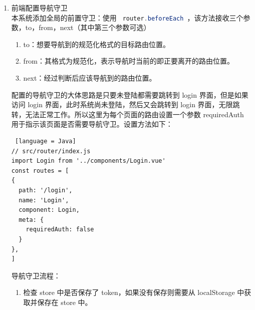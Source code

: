 \begin{enumerate}
\begin{lstlisting} [language = Java]
    \end{lstlisting}
        \begin{enumerate}
          \item 在 auth.js 的 state 中： 创建一个 authDate 对象，其中保存用户的Token，refreshToken，tokenExp，userId，userName，userType，以及一个loginStatus。
          \item 在 auth.js 的 getter 中：创建 getLoginStatus() 用于获取用户的登陆状态（是否登陆），创建 getAuthDate() 用于获取用户的身份信息，创建 isTokenActive() 用于判断 Token 是否过期。
          \item 在 auth.js 的 mutations 中：创建 saveTokenDate() 用于更新 authDate 以及 将 token 保存在浏览器的 localStorage 中。创建 setLoginStatus() 用于更新登陆状态。创建 signout() 用于登出（清除localStorage中的Token，以及将登陆状态更改为未登陆）。
          \item 在 auth.js 的 actions 中：创建异步函数 login() 用于登陆（使用 axios 发送请求，将 paylaod(username, password, usertype) 放在请求体中发送给后端，使用 mutations 中方法处理返回的结果，成功登陆。
        \end{enumerate}
  \item 前端配置导航守卫\\
        本系统添加全局的前置守卫：使用 \lstinline[language = Java]| router.beforeEach |，该方法接收三个参数，to，from，next（其中第三个参数可选）
        \begin{enumerate}
          \item to：想要导航到的规范化格式的目标路由位置。
          \item from：其格式为规范化，表示导航时当前的即正要离开的路由位置。
          \item next：经过判断后应该导航到的路由位置。
        \end{enumerate}
        配置的导航守卫的大体思路是只要未登陆都需要跳转到 login 界面，但是如果访问 login 界面，此时系统尚未登陆，然后又会跳转到 login 界面，无限跳转，无法正常工作。所以这里为每个页面的路由设置一个参数 requiredAuth 用于指示该页面是否需要导航守卫。设置方法如下：
        \begin{lstlisting} [language = Java]
// src/router/index.js
import Login from '../components/Login.vue'
const routes = [
{
  path: '/login',
  name: 'Login',
  component: Login,
  meta: {
    requiredAuth: false
  }
},
]
    \end{lstlisting}
        导航守卫流程：
        \begin{enumerate}
          \item 检查 store 中是否保存了 token，如果没有保存则需要从 localStorage 中获取并保存在 store 中。

\end{enumerate}
\end{enumerate}
